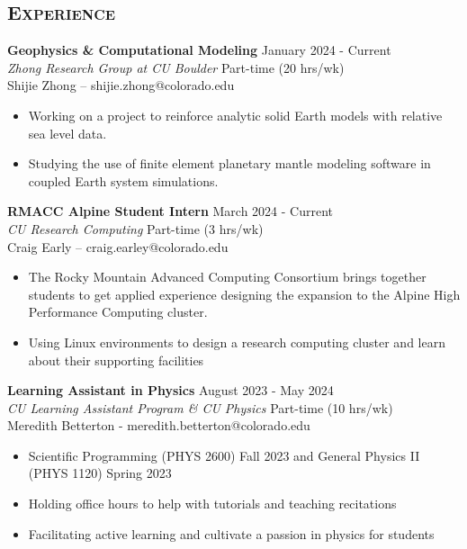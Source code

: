 \documentclass[11pt,line,letterpaper,margin]{res}
\begin{document}
\begin{resume}
\section{\scshape Experience} 
                {\bf Geophysics \& Computational Modeling} \hfill January 2024 - Current\\
                {\sl Zhong Research Group at CU Boulder} \hfill Part-time (20 hrs/wk)\\
                Shijie Zhong – shijie.zhong@colorado.edu
                \begin{itemize} \itemsep -2pt
                \item Working on a project to reinforce analytic solid Earth models with relative sea level data.
                \item Studying the use of finite element planetary mantle modeling software in coupled Earth system simulations.
                \end{itemize}

                {\bf RMACC Alpine Student Intern} \hfill  March 2024 - Current\\
                {\sl CU Research Computing} \hfill Part-time (3 hrs/wk)\\
                Craig Early – craig.earley@colorado.edu
                 \begin{itemize}  \itemsep -2pt %
                 \item The Rocky Mountain Advanced Computing Consortium brings together students to get applied experience designing the expansion to the Alpine High Performance Computing cluster.
                 \item Using Linux environments to design a research computing cluster and learn about their supporting facilities 
                \end{itemize}
                
                {\bf Learning Assistant in Physics} \hfill  August 2023 - May 2024\\
                {\sl CU Learning Assistant Program \& CU Physics} \hfill Part-time (10 hrs/wk)\\
                Meredith Betterton - meredith.betterton@colorado.edu
                 \begin{itemize}  \itemsep -2pt %
                 \item Scientific Programming (PHYS 2600) Fall 2023 and General Physics II (PHYS 1120) Spring 2023
                \item Holding office hours to help with tutorials and teaching recitations
                \item Facilitating active learning and cultivate a passion in physics for students
                \end{itemize}


\end{resume}
\end{document}
